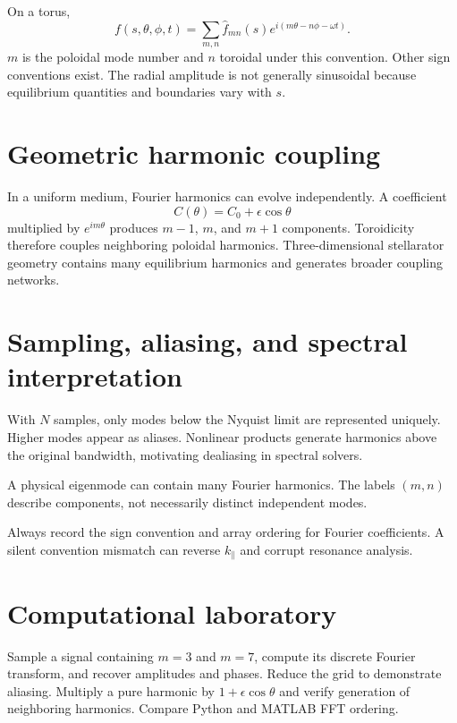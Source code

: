 \documentclass[11pt]{article}
\begin{document}
On a torus,
\begin{equation}
f(s,\theta,\phi,t)=\sum_{m,n}\hat f_{mn}(s)
e^{i(m\theta-n\phi-\omega t)}.
\end{equation}
$m$ is the poloidal mode number and $n$ toroidal under this convention. Other sign conventions exist. The radial amplitude is not generally sinusoidal because equilibrium quantities and boundaries vary with $s$.


\section{Geometric harmonic coupling}

In a uniform medium, Fourier harmonics can evolve independently. A coefficient
\begin{equation}
C(\theta)=C_0+\epsilon\cos\theta
\end{equation}
multiplied by $e^{im\theta}$ produces $m-1$, $m$, and $m+1$ components. Toroidicity therefore couples neighboring poloidal harmonics. Three-dimensional stellarator geometry contains many equilibrium harmonics and generates broader coupling networks.


\section{Sampling, aliasing, and spectral interpretation}

With $N$ samples, only modes below the Nyquist limit are represented uniquely. Higher modes appear as aliases. Nonlinear products generate harmonics above the original bandwidth, motivating dealiasing in spectral solvers.

A physical eigenmode can contain many Fourier harmonics. The labels $(m,n)$ describe components, not necessarily distinct independent modes.

\begin{physicsbox}
Always record the sign convention and array ordering for Fourier coefficients. A silent convention mismatch can reverse $k_\parallel$ and corrupt resonance analysis.
\end{physicsbox}


\section{Computational laboratory}

Sample a signal containing $m=3$ and $m=7$, compute its discrete Fourier transform, and recover amplitudes and phases. Reduce the grid to demonstrate aliasing. Multiply a pure harmonic by $1+\epsilon\cos\theta$ and verify generation of neighboring harmonics. Compare Python and MATLAB FFT ordering.
\end{document}
